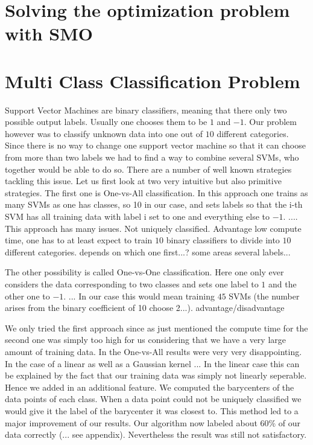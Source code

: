 \documentclass[12pt, a4paper, openany, bibliography=totoc]{report} %
\theoremstyle{definition}
\numberwithin{equation}{chapter}
\begin{document}
\chapter*{Solving the optimization problem with SMO}


\chapter*{Multi Class Classification Problem}

Support Vector Machines are binary classifiers, meaning that there only two possible output labels. Usually one chooses them to be $1$ and $-1$. Our problem however was to classify unknown data into one out of $10$ different categories. Since there is no way to change one support vector machine so that it can choose from more than two labels we had to find a way to combine several SVMs, who together would be able to do so. There are a number of well known strategies tackling this issue. Let us first look at two very intuitive but also primitive strategies. The first one is One-vs-All classification. In this approach one trains as many SVMs as one has classes, so 10 in our case, and sets labels so that the i-th SVM has all training data with label i set to one and everything else to $-1$. .... This approach has many issues. Not uniquely classified. Advantage low compute time, one has to at least expect to train $10$ binary classifiers to divide into $10$ different categories. depends on which one first...? some areas several labels...  

The other possibility is called One-vs-One classification. Here one only ever considers the data corresponding to two classes and sets one label to $1$ and the other one to $-1$. ... 
In our case this would mean training $45$ SVMs (the number arises from the binary coefficient of 10 choose 2...). advantage/disadvantage

We only tried the first approach since as just mentioned the compute time for the second one was simply too high for us considering that we have a very large amount of training data. In the One-vs-All results were very very disappointing. In the case of a linear as well as a Gaussian kernel ... In the linear case this can be explained by the fact that our training data was simply not linearly seperable. 
Hence we added in an additional feature. We computed the barycenters of the data points of each class. When a data point could not be uniquely classified we would give it the label of the barycenter it was closest to. This method led to a major improvement of our results. Our algorithm now labeled about 60\% of our data correctly (... see appendix).  Nevertheless the result was still not satisfactory. 
\end{document}
